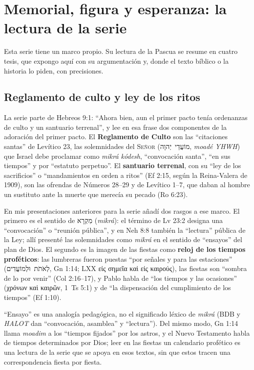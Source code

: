 \documentclass[11pt,letterpaper]{article}
\newcommand{\heb}[1]{\mbox{\foreignlanguage{hebrew}{#1}}}
\newcommand{\grc}[1]{\foreignlanguage{ancientgreek}{#1}}
\newcommand{\SENOR}{\textsc{Señor}}
\newcommand{\destacar}[1]{\textbf{\textcolor{tierraroja}{#1}}}
\begin{document}
\section{Memorial, figura y esperanza: la lectura de la serie}

Esta serie tiene un marco propio. Su lectura de la Pascua se resume en cuatro tesis, que expongo aquí con su argumentación y, donde el texto bíblico o la historia lo piden, con precisiones.

\subsection{Reglamento de culto y ley de los ritos}
La serie parte de Hebreos 9:1: ``Ahora bien, aun el primer pacto tenía ordenanzas de culto y un santuario terrenal'', y lee en esa frase dos componentes de la adoración del primer pacto. El \destacar{Reglamento de Culto} son las ``citaciones santas'' de Levítico 23, las solemnidades del \SENOR{} (\heb{מוֹעֲדֵי יְהוָה}, \emph{moadé YHWH}) que Israel debe proclamar como \emph{mikrá kódesh}, ``convocación santa'', ``en sus tiempos'' y por ``estatuto perpetuo''. El \destacar{santuario terrenal}, con su ``ley de los sacrificios'' o ``mandamientos en orden a ritos'' (Ef 2:15, según la Reina-Valera de 1909), son las ofrendas de Números 28--29 y de Levítico 1--7, que daban al hombre un sustituto ante la muerte que merecía su pecado (Ro 6:23).

En mis presentaciones anteriores para la serie añadí dos rasgos a ese marco. El primero es el sentido de \heb{מִקְרָא} (\emph{mikrá}): el término de Lv 23:2 designa una ``convocación'' o ``reunión pública'', y en Neh 8:8 también la ``lectura'' pública de la Ley; allí presenté las solemnidades como \emph{mikrá} en el sentido de ``ensayos'' del plan de Dios. El segundo es la imagen de las fiestas como \destacar{reloj de los tiempos proféticos}: las lumbreras fueron puestas ``por señales y para las estaciones'' (\heb{לְאֹתֹת וּלְמוֹעֲדִים}, Gn 1:14; LXX \grc{εἰς σημεῖα καὶ εἰς καιρούς}), las fiestas son ``sombra de lo por venir'' (Col 2:16--17), y Pablo habla de ``los tiempos y las ocasiones'' (\grc{χρόνων καὶ καιρῶν}, 1~Ts 5:1) y de ``la dispensación del cumplimiento de los tiempos'' (Ef 1:10).

\begin{nota}[Precisión]
``Ensayo'' es una analogía pedagógica, no el significado léxico de \emph{mikrá} (BDB y \emph{HALOT} dan ``convocación, asamblea'' y ``lectura''). Del mismo modo, Gn 1:14 llama \emph{moadim} a los ``tiempos fijados'' por los astros, y el Nuevo Testamento habla de tiempos determinados por Dios; leer en las fiestas un calendario profético es una lectura de la serie que se apoya en esos textos, sin que estos tracen una correspondencia fiesta por fiesta.
\end{nota}
\end{document}
